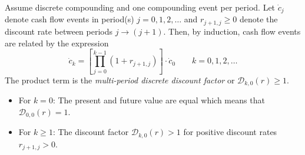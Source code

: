 \documentclass[11pt]{article}
\theoremstyle{definition}
\begin{document}
\begin{definition}\label{defn:multiple-period-discrete-conversion}
Assume discrete compounding and one compounding event per period. Let $\dot{c}_{j}$ denote cash flow events in period(s) $j = 0,1,2,\dots$ 
and $r_{j+1,j}\geq{0}$ denote the discount rate between periods $j\rightarrow{(j+1)}$.
Then, by induction, cash flow events are related by the expression
\begin{equation*}
\dot{c}_{k} = \left[\prod_{j=0}^{k-1}\left(1+r_{j+1,j}\right)\right]\cdot\dot{c}_{0}\qquad{k=0,1,2,\dots}
\end{equation*}
The product term is the \textit{multi-period discrete discount factor} or $\mathcal{D}_{k,0}(r)\geq{1}$.
\begin{itemize}[leftmargin=*]
	\item{For $k=0$: The present and future value are equal which means that $\mathcal{D}_{0,0}(r) = 1$.}
	\item{For $k\geq{1}$: The discount factor $\mathcal{D}_{k,0}(r)>{1}$ for positive discount rates $r_{j+1,j}>0$.}
\end{itemize}

\end{definition}
\end{document}
